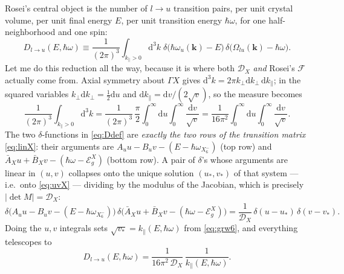 \documentclass[11pt,a4paper]{article}
\numberwithin{equation}{section}
\newcommand{\hw}{\hbar\omega}
\newcommand{\EgX}{\mathcal{E}_g^{X}}
\newcommand{\cD}{\mathcal{D}}
\newcommand{\cF}{\mathcal{F}}
\newcommand{\AX}{\bar{A}_X}
\newcommand{\BX}{\bar{B}_X}
\newcommand{\kperp}{k_{\perp}}
\newcommand{\kpar}{k_{\parallel}}
\newcommand{\dd}{\mathrm{d}}
\newcommand{\wXsix}{\hbar\omega_{X_6^-}}
\begin{document}
Rosei's central object is the number of $l\to u$ transition pairs, per
unit crystal volume, per unit final energy $E$, per unit transition
energy $\hw$, for one half-neighborhood and one spin:
\begin{equation}
D_{l\to u}(E,\hw)\equiv\frac{1}{(2\pi)^3}
\int_{\kpar>0}\!\dd^3k\;
\delta\bigl(\hbar\omega_u(\mathbf k)-E\bigr)\,
\delta\bigl(\Omega_{lu}(\mathbf k)-\hw\bigr).
\label{eq:Ddef}
\end{equation}
Let me do this reduction all the way, because it is where both
$\cD_X$ \emph{and} Rosei's $\cF$ actually come from. Axial symmetry
about $\Gamma X$ gives $\dd^3k=2\pi\kperp\dd\kperp\,\dd\kpar$; in the
squared variables $\kperp\dd\kperp=\tfrac12\dd u$ and
$\dd\kpar=\dd v/(2\sqrt v)$, so the measure becomes
\[
\frac{1}{(2\pi)^3}\int_{\kpar>0}\!\dd^3k
=\frac{1}{(2\pi)^3}\,\frac{\pi}{2}
 \int_0^\infty\!\!\dd u\int_0^\infty\!\frac{\dd v}{\sqrt v}
=\frac{1}{16\pi^2}
 \int_0^\infty\!\!\dd u\int_0^\infty\!\frac{\dd v}{\sqrt v}.
\]
The two $\delta$-functions in \eqref{eq:Ddef} are \emph{exactly the
two rows of the transition matrix} \eqref{eq:linX}: their arguments
are $A_u u-B_u v-(E-\wXsix)$ (top row) and $\AX u+\BX v-(\hw-\EgX)$
(bottom row). A pair of $\delta$'s whose arguments are linear in
$(u,v)$ collapses onto the unique solution $(u_*,v_*)$ of that system
--- i.e.\ onto \eqref{eq:uvX} --- dividing by the modulus of the
Jacobian, which is precisely $|\det M|=\cD_X$:
\[
\delta\!\bigl(A_u u-B_u v-(E-\wXsix)\bigr)\,
\delta\!\bigl(\AX u+\BX v-(\hw-\EgX)\bigr)
=\frac{1}{\cD_X}\,\delta(u-u_*)\,\delta(v-v_*).
\]
Doing the $u,v$ integrals sets $\sqrt{v_*}=\kpar(E,\hw)$ from
\eqref{eq:grw6}, and everything telescopes to
\begin{equation}
D_{l\to u}(E,\hw)=\frac{1}{16\pi^2\,\cD_X}\,\frac{1}{\kpar(E,\hw)}.
\label{eq:Dintermediate}
\end{equation}
\end{document}
